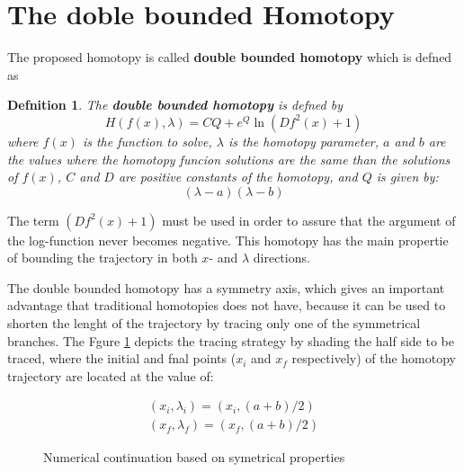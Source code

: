 \documentclass[conference]{IEEEtran}
\newtheorem{Theod}{{\bf Def\text{i}nition}}
\begin{document}
\section{The doble bounded Homotopy}


The proposed homotopy is called {\bf double bounded homotopy} which is defned as
\begin{Theod}
The {\bf double bounded homotopy} is defned by
\begin{equation}
H(f(x),\lambda)=CQ+e^Q\ln(Df^2(x)+1)
\label{fx}
\end{equation}
where $f(x)$ is the function to solve, $\lambda$ is the homotopy parameter, $a$ and $b$ are the values where the homotopy funcion solutions
are the same than the solutions of $f(x)$,
$C$ and $D$ are positive constants of the homotopy, and $Q$ is given by:
\begin{displaymath}
(\lambda-a)(\lambda-b)
\end{displaymath}
\label{InestCond3}
\end{Theod}
The term $(Df^2(x)+1)$ must be used in order
to assure that the argument of the log-function  never becomes negative. This homotopy has the main propertie of
bounding the trajectory in both $x$- and $\lambda$ directions.


The double bounded homotopy has a  symmetry axis, which  gives  an important advantage that traditional homotopies
does not have, because it can
be used to shorten the lenght of the trajectory  by tracing only one of the symmetrical branches.
 The Fgure \ref{halftrack} depicts
the tracing strategy by shading the half side to be traced,
where the initial and fnal points ($x_i$ and $x_f$ respectively) of the homotopy trajectory  are located
at the value of:

\begin{displaymath}
\begin{array}{l}
(x_i,\lambda_i)=(x_i,(a+b)/2)\\
(x_f,\lambda_f)=(x_f,(a+b)/2)
\end{array}
\end{displaymath}


\begin{figure}[hbtp]
\centerline{
\epsfxsize=80mm
}
\caption{Numerical continuation  based on symetrical properties}
\label{halftrack}
\end{figure}
\end{document}
